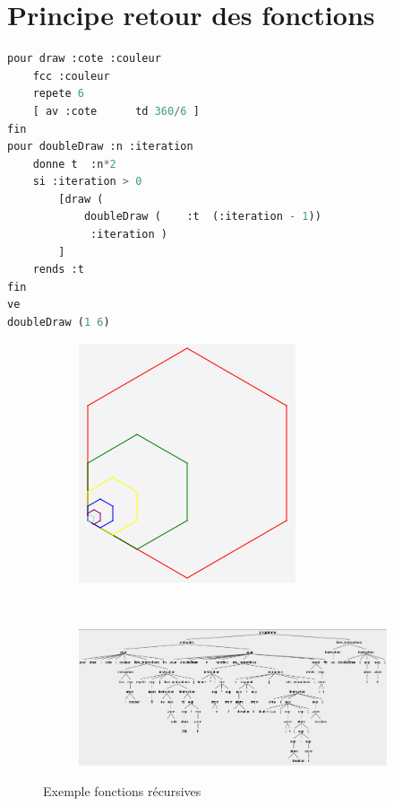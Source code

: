 \documentclass[a4paper,11pt]{article}
\begin{document}
\section{Principe retour des fonctions}
\begin{lstlisting}[language=Python]
pour draw :cote :couleur
	fcc :couleur
	repete 6 
	[ av :cote  	td 360/6 ]
fin
pour doubleDraw :n :iteration
	donne t  :n*2
	si :iteration > 0 
		[draw (
			doubleDraw (	:t  (:iteration - 1))
			 :iteration )
		]
	rends :t
fin
ve
doubleDraw (1 6)
\end{lstlisting}
\begin{figure}[!h]
	\centering
	\begin{subfigure}[t]{.2\textwidth}
		\includegraphics[width=\textwidth]{img/function_figure}
	\end{subfigure}
	~
	\begin{subfigure}[t]{\textwidth}
		\includegraphics[width=\textwidth]{img/function_tree}
	\end{subfigure}
	\caption{Exemple fonctions récursives}
\end{figure}

\end{document}
